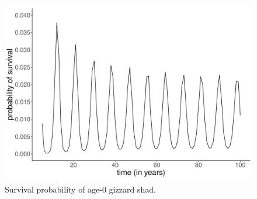 \documentclass[preprint,review,12pt,authoryear]{elsarticle}
\providecommand{\DIFaddbeginFL}{} %
\providecommand{\DIFaddendFL}{} %
\providecommand{\DIFdelbeginFL}{} %
\providecommand{\DIFdelendFL}{} %
\begin{document}
\begin{figure}
\centering
  \DIFdelbeginFL %
\DIFdelendFL \DIFaddbeginFL \includegraphics[width=.5\textwidth]{figures/Figure2a.pdf}
   \DIFaddendFL \caption{}
  \label{fig:age0time}

\caption{Survival probability of age-0 gizzard shad.}

\end{figure}    
\end{document}
